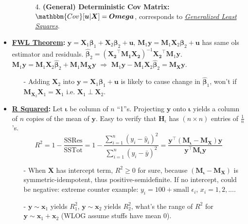 \documentclass[9pt, landscape]{article}
\begin{document}
\begin{multicols*}{3}
\begin{itemize}
\begin{itemize}[leftmargin=10pt,noitemsep,topsep=0pt,partopsep=0pt]
\begin{itemize}[leftmargin=10pt,noitemsep,topsep=0pt,partopsep=0pt]
			\item[4.] \textbf{(General) Deterministic Cov Matrix:} $\mathbbm{Cov}[\bm{u} | \bm{X}] = \bm{Omega}$, corresponds to \href{https://en.wikipedia.org/wiki/Generalized_least_squares}{\textit{Generalized Least Squares}}.
		\end{itemize}
	\end{itemize}
	\item \textbf{\href{https://en.wikipedia.org/wiki/Frisch-Waugh-Lovell_theorem}{FWL Theorem}:} $\bm{y} = \bm{X}_1 \bm{\beta}_1 + \bm{X}_2 \bm{\beta}_2 + \bm{u}$, $\bm{M}_1\bm{y} = \bm{M}_1 \bm{X}_2 \bm{\beta}_2 + \bm{u}$ has same ols estimator and residuals. $\widehat{\bm{\beta}}_2 = (\bm{X_2}^{\top} \bm{M_1}\bm{X_2})^{-1} \bm{X_2}^{\top} \bm{M}_1 \bm{y}$. $\bm{M}_1 \bm{y} = \bm{M}_1 \bm{X}_2 \widehat{\bm{\beta}}_2 + \bm{M}_1 \bm{M}_{\bm{X}} \bm{y}$ $\Rightarrow$ $\bm{M}_1 \bm{y} - \bm{M}_1 \bm{X}_2 \widehat{\bm{\beta}}_2 = \bm{M}_{\bm{X}} \bm{y}$. 
	\begin{itemize}[leftmargin=10pt,noitemsep,topsep=0pt,partopsep=0pt]
		\item[-] Adding $\bm{X}_2$ into $\bm{y} = \bm{X}_1 \bm{\beta}_1 + \bm{u}$ is likely to cause change in $\widehat{\bm{\beta}}_1$, won't if $\bm{M}_{\bm{X}_2} \bm{X}_1 = \bm{X}_1$ i.e. $\bm{X}_1 \perp \bm{X}_2$.
	\end{itemize}
	\item \textbf{\href{https://en.wikipedia.org/wiki/Coefficient_of_determination}{R Squared}: } Let $\bm{\iota}$ be column of $n$ ``1''s. Projecting $\bm{y}$ onto $\bm{\iota}$ yields a column of $n$ copies of the mean of $\bm{y}$. Easy to verify that $\bm{H}_{\iota}$ has $(n\times n)$ entries of $\frac{1}{n}$'s.
	$$
	R^2 = 1 - \frac{\text{SSRes}}{\text{SSTot}} = 1 - \frac{\sum_{i=1}^n (y_i - \widehat{y}_i)^2}{\sum_{i=1}^n (y_i - \bar{y})^2} = \frac{\bm{y}^{\top} (\bm{M}_{\bm{\iota}} - \bm{M}_{\bm{X}}) \bm{y}}{\bm{y}^{\top} \bm{M}_{\bm{\iota}} \bm{y}}
	$$
	\begin{itemize}[leftmargin=10pt,noitemsep,topsep=0pt,partopsep=0pt]
		\item[-] When $\bm{X}$ has intercept term, $R^2 \geq 0$ for sure, because $(\bm{M}_{\bm{\iota}} - \bm{M}_{\bm{X}})$ is symmetric-idempotent, thus positive-semidefinite. If no intercept, could be negative: extreme counter example: $y_i = 100 + \text{small } \epsilon_i$, $x_i=1,2,...$. 
		\item[-] $\bm{y} \sim \bm{x}_1$ yields $R_1^2$, $\bm{y} \sim \bm{x}_2$ yields $R_2^2$, what's the range of $R^2$ for $\bm{y} \sim \bm{x}_1 + \bm{x}_2$ (WLOG assume stuffs have mean 0). \\

\end{itemize}
\end{itemize}
\end{multicols*}
\end{document}
